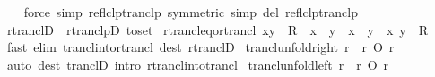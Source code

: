 \begin{isabellebody}
%
\isadelimproof
\ \ %
\endisadelimproof
%
\isatagproof
{}\isamarkupfalse%
\ {\isacharparenleft}{\kern0pt}force\ simp{\isacharcolon}{\kern0pt}\ reflclp{\isacharunderscore}{\kern0pt}tranclp\ {\isacharbrackleft}{\kern0pt}symmetric{\isacharbrackright}{\kern0pt}\ simp\ del{\isacharcolon}{\kern0pt}\ reflclp{\isacharunderscore}{\kern0pt}tranclp{\isacharparenright}{\kern0pt}%
\endisatagproof
{\isafoldproof}%
%
\isadelimproof
\isanewline
%
\endisadelimproof
\isanewline
{}\isamarkupfalse%
\ rtranclD\ {\isacharequal}{\kern0pt}\ rtranclpD\ {\isacharbrackleft}{\kern0pt}to{\isacharunderscore}{\kern0pt}set{\isacharbrackright}{\kern0pt}\isanewline
\isanewline
{}\isamarkupfalse%
\ rtrancl{\isacharunderscore}{\kern0pt}eq{\isacharunderscore}{\kern0pt}or{\isacharunderscore}{\kern0pt}trancl{\isacharcolon}{\kern0pt}\ {\isachardoublequoteopen}{\isacharparenleft}{\kern0pt}x{\isacharcomma}{\kern0pt}y{\isacharparenright}{\kern0pt}\ {\isasymin}\ R\isactrlsup {\isacharasterisk}{\kern0pt}\ {\isasymlongleftrightarrow}\ x\ {\isacharequal}{\kern0pt}\ y\ {\isasymor}\ x\ {\isasymnoteq}\ y\ {\isasymand}\ {\isacharparenleft}{\kern0pt}x{\isacharcomma}{\kern0pt}\ y{\isacharparenright}{\kern0pt}\ {\isasymin}\ R\isactrlsup {\isacharplus}{\kern0pt}{\isachardoublequoteclose}\isanewline
%
\isadelimproof
\ \ %
\endisadelimproof
%
\isatagproof
{}\isamarkupfalse%
\ {\isacharparenleft}{\kern0pt}fast\ elim{\isacharcolon}{\kern0pt}\ trancl{\isacharunderscore}{\kern0pt}into{\isacharunderscore}{\kern0pt}rtrancl\ dest{\isacharcolon}{\kern0pt}\ rtranclD{\isacharparenright}{\kern0pt}%
\endisatagproof
{\isafoldproof}%
%
\isadelimproof
\isanewline
%
\endisadelimproof
\isanewline
{}\isamarkupfalse%
\ trancl{\isacharunderscore}{\kern0pt}unfold{\isacharunderscore}{\kern0pt}right{\isacharcolon}{\kern0pt}\ {\isachardoublequoteopen}r\isactrlsup {\isacharplus}{\kern0pt}\ {\isacharequal}{\kern0pt}\ r\isactrlsup {\isacharasterisk}{\kern0pt}\ O\ r{\isachardoublequoteclose}\isanewline
%
\isadelimproof
\ \ %
\endisadelimproof
%
\isatagproof
{}\isamarkupfalse%
\ {\isacharparenleft}{\kern0pt}auto\ dest{\isacharcolon}{\kern0pt}\ tranclD{}\ intro{\isacharcolon}{\kern0pt}\ rtrancl{\isacharunderscore}{\kern0pt}into{\isacharunderscore}{\kern0pt}trancl{}{\isacharparenright}{\kern0pt}%
\endisatagproof
{\isafoldproof}%
%
\isadelimproof
\isanewline
%
\endisadelimproof
\isanewline
{}\isamarkupfalse%
\ trancl{\isacharunderscore}{\kern0pt}unfold{\isacharunderscore}{\kern0pt}left{\isacharcolon}{\kern0pt}\ {\isachardoublequoteopen}r\isactrlsup {\isacharplus}{\kern0pt}\ {\isacharequal}{\kern0pt}\ r\ O\ r\isactrlsup {\isacharasterisk}{\kern0pt}{\isachardoublequoteclose}\isanewline

\end{isabellebody}
